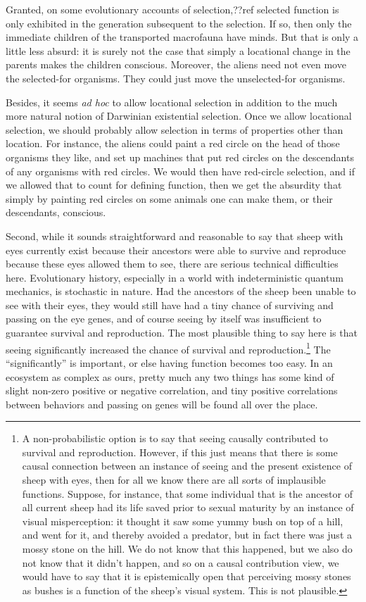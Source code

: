 Granted, on some evolutionary accounts of selection,??ref selected function is only exhibited in the generation
subsequent to the selection. If so, then only the immediate children of the transported macrofauna have minds.
But that is only a little less absurd: it is surely not the case that simply a locational change in the parents
makes the children conscious. Moreover, the aliens need not even move the selected-for organisms. They could just
move the unselected-for organisms.

Besides, it seems \textit{ad hoc} to allow locational selection in addition to the much more natural notion of 
Darwinian existential selection. Once we allow locational selection, we should probably allow selection in terms 
of properties other than location. For instance, the aliens could paint a red circle on the head of those organisms
they like, and set up machines that put red circles on the descendants of any organisms with red circles. We would
then have red-circle selection, and if we allowed that to count for defining function, then we get the absurdity
that simply by painting red circles on some animals one can make them, or their descendants, conscious. 

Second, while it sounds straightforward and reasonable to say that sheep with eyes currently exist because their 
ancestors were able to survive and reproduce because these eyes allowed them to see, there are 
serious technical difficulties here. Evolutionary history, especially in a world with indeterministic quantum
mechanics, is stochastic in nature. Had the ancestors of the sheep been unable to see with their eyes, they would 
still have had a tiny chance of surviving and passing on the eye genes, and of course seeing by itself was insufficient 
to guarantee survival and reproduction. The most plausible thing to say here is that seeing significantly increased the chance of 
survival and reproduction.\footnote{A non-probabilistic option is to say that seeing causally contributed to survival and 
reproduction. However, if this just means that there is some causal connection between an instance of seeing and the 
present existence of sheep with eyes, then for all we know there are all sorts of implausible functions. Suppose, for
instance, that some individual that is the ancestor of all current sheep had its life saved prior to sexual maturity  
by an instance of visual misperception: it thought it saw some yummy bush on top of a hill, and went for it, 
and thereby avoided a predator, but in fact there was just a mossy stone on the hill. We do not know that this happened,
but we also do not know that it didn't happen, and so on a causal contribution view, we would have to say that it is 
epistemically open that perceiving mossy stones as bushes is a function of the sheep's visual system. This is not 
plausible.} The ``significantly'' is important, or else having function becomes too easy. In an ecosystem as complex 
as ours, pretty much any two things has some kind of slight non-zero positive or negative correlation, and tiny positive 
correlations between behaviors and passing on genes will be found all over the place. 

